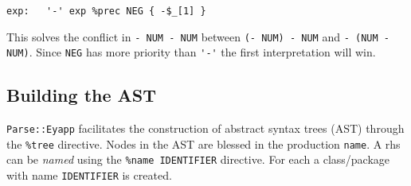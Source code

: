 \begin{verbatim}
exp:   '-' exp %prec NEG { -$_[1] }
\end{verbatim}
This solves  the conflict in \verb|- NUM - NUM|
between \verb|(- NUM) - NUM| and
{\tt - (NUM - NUM)}. Since \verb|NEG| has more
priority than \verb|'-'| the first interpretation 
will win.

\subsection{Building the AST}
\verb|Parse::Eyapp| facilitates the construction of 
abstract syntax trees (AST) through the \verb|%tree|
directive. 
Nodes in the AST are blessed in the production
\verb|name|. 
A rhs can be 
{\it named} using the \verb|%name IDENTIFIER| directive. 
For each  a 
class/package with name \verb|IDENTIFIER| is created. 

